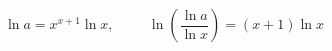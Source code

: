 \begin{displaymath}
\ln a = x^{x+1}\ln x, \hspace{1cm} \ln\left( \frac{\ln a }{\ln x }\right) = (x+1)\ln x    
\end{displaymath}

